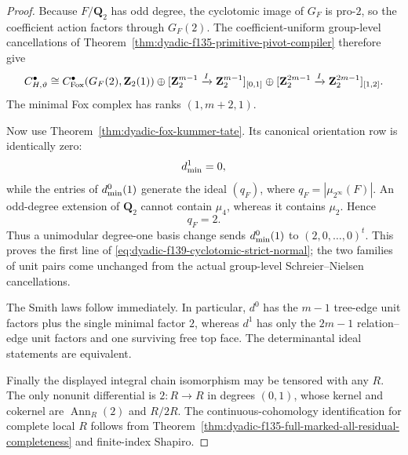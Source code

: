 \documentclass[11pt]{article}
\theoremstyle{definition}
\begin{document}
\begin{proof}
Because $F/\mathbf Q_2$ has odd degree, the cyclotomic
image of $G_F$ is pro-$2$, so the coefficient action
factors through $G_F(2)$.  The coefficient-uniform
group-level cancellations of
Theorem~\ref{thm:dyadic-f135-primitive-pivot-compiler}
therefore give
\[
C_{H,\vartheta}^\bullet\cong
C_{\rm Fox}^\bullet(G_F(2),\mathbf Z_2(1))
\oplus
[\mathbf Z_2^{m-1}\xrightarrow{I}
 \mathbf Z_2^{m-1}]_{[0,1]}
\oplus
[\mathbf Z_2^{2m-1}\xrightarrow{I}
 \mathbf Z_2^{2m-1}]_{[1,2]} .
\]
The minimal Fox complex has ranks $(1,m+2,1)$.

Now use
Theorem~\ref{thm:dyadic-fox-kummer-tate}.
Its canonical orientation row is identically zero:
\[
d^1_{\rm min}=0,
\]
while the entries of $d^0_{\rm min}(1)$ generate
the ideal $(q_F)$, where
$q_F=|\mu_{2^\infty}(F)|$.
An odd-degree extension of $\mathbf Q_2$ cannot
contain $\mu_4$, whereas it contains $\mu_2$.
Hence
\[
q_F=2.
\]
Thus a unimodular degree-one basis change sends
$d^0_{\rm min}(1)$ to $(2,0,\ldots,0)^t$.
This proves the first line of
\eqref{eq:dyadic-f139-cyclotomic-strict-normal};
the two families of unit pairs come unchanged from
the actual group-level Schreier--Nielsen
cancellations.

The Smith laws follow immediately.  In particular,
$d^0$ has the $m-1$ tree-edge unit factors plus the
single minimal factor $2$, whereas $d^1$ has only
the $2m-1$ relation--edge unit factors and one
surviving free top face.  The determinantal ideal
statements are equivalent.

Finally the displayed integral chain isomorphism
may be tensored with any $R$.  The only nonunit
differential is $2:R\to R$ in degrees $(0,1)$,
whose kernel and cokernel are
$\operatorname{Ann}_R(2)$ and $R/2R$.
The continuous-cohomology identification for
complete local $R$ follows from
Theorem~\ref{thm:dyadic-f135-full-marked-all-residual-completeness}
and finite-index Shapiro.
\end{proof}
\end{document}
